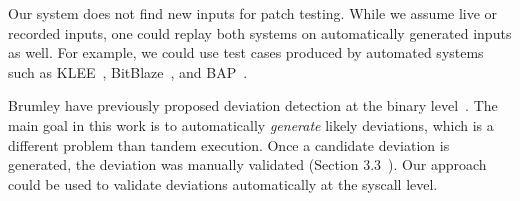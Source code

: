 Our system does not find new inputs for patch testing. While we
assume live or recorded inputs, one could replay both systems on
automatically generated inputs as well.  For example, we could use
test cases produced by automated systems such as
KLEE~\cite{cadar:2008}, BitBlaze~\cite{bitblaze}, and BAP~\cite{bap}.

Brumley \etal have previously proposed deviation detection at the
binary level~\cite{brumley:2007:deviations}.  The main goal in this
work is to automatically \emph{generate} likely deviations, which is a
different problem than tandem execution.  Once a candidate deviation
is generated, the deviation was manually validated (Section
3.3~\cite{brumley:2007:deviations}). Our approach could be used to
validate deviations automatically at the syscall level.





